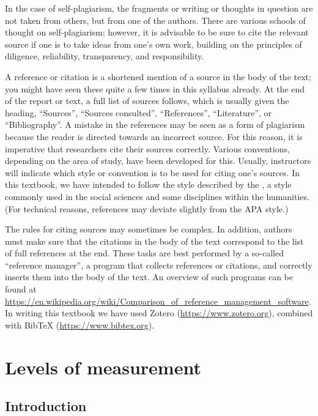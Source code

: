 \documentclass[
]{book}
\begin{document}
In the case of self-plagiarism, the fragments or writing or thoughts in question are not taken from others, but from one of the authors. There are various schools of thought on self-plagiarism; however, it is advisable to be sure to cite the relevant source if one is to take ideas from one's own work, building on the principles of diligence, reliability, transparency, and responsibility.

A reference or citation is a shortened mention of a source in the body of the text; you might have seen these quite a few times in this syllabus already. At the end of the report or text, a full list of sources follows, which is usually given the heading, ``Sources'', ``Sources consulted'', ``References'', ``Literature'', or ``Bibliography''. A mistake in the references may be seen as a form of plagiarism \citep{UBVU15} because the reader is directed towards an incorrect source. For this reason, it is imperative that researchers cite their sources correctly. Various conventions, depending on the area of study, have been developed for this. Usually, instructors will indicate which style or convention is to be used for citing one's sources. In this textbook, we have intended to follow the style described by the \citet{APA10}, a style commonly used in the social sciences and some disciplines within the humanities.
(For technical reasons, references may deviate slightly from the APA style.)

The rules for citing sources may sometimes be complex. In addition, authors must make sure that the citations in the body of the text correspond to the list of full references at the end. These tasks are best performed by a so-called ``reference manager'', a program that collects references or citations, and correctly inserts them into the body of the text. An overview of such programs can be found at
\url{https://en.wikipedia.org/wiki/Comparison_of_reference_management_software}.
In writing this textbook we have used Zotero (\url{https://www.zotero.org}),
combined with BibTeX (\url{https://www.bibtex.org}).

\hypertarget{ch-levelsofmeasurement}{%
\chapter{Levels of measurement}\label{ch-levelsofmeasurement}}

\hypertarget{introduction-1}{%
\section{Introduction}\label{introduction-1}}
\end{document}
